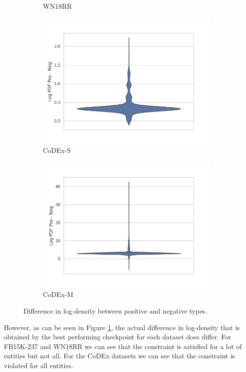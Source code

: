 \begin{figure}
\begin{subfigure}[b]{0.492\columnwidth}
        \caption{WN18RR}
    \end{subfigure}
    \begin{subfigure}[b]{0.492\columnwidth}
        \includegraphics[trim=0cm 11mm 1cm 0pt, clip]{figures/analysis/embedprior/codex-s_analysis_prior_lpdf_diff.png}
        \caption{CoDEx-S}
    \end{subfigure}
    \begin{subfigure}[b]{0.492\columnwidth}
        \includegraphics[trim=0cm 11mm 1cm 0pt, clip]{figures/analysis/embedprior/codex-m_analysis_prior_lpdf_diff.png}
        \caption{CoDEx-M}
    \end{subfigure}
    \vspace{-1em}
    \caption[Difference in density between positive and negative types.]{Difference in log-density between positive and negative types.}
    \label{fig:embedprior_lpdf_diffs}
\end{figure}
However, as can be seen in Figure \ref{fig:embedprior_lpdf_diffs}, the actual difference in log-density that is obtained by the best performing checkpoint for each dataset does differ.
For FB15K-237 and WN18RR we can see that the constraint is satisfied for a lot of entities but not all. For the CoDEx datasets we can see that the constraint is violated for all entities.

